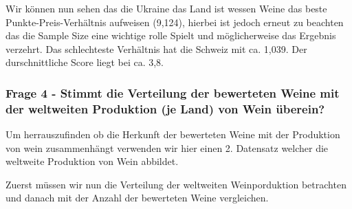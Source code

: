 \documentclass[
]{article}
\begin{document}
Wir können nun sehen das die Ukraine das Land ist wessen Weine das beste
Punkte-Preis-Verhältnis aufweisen (9,124), hierbei ist jedoch erneut zu
beachten das die Sample Size eine wichtige rolle Spielt und
möglicherweise das Ergebnis verzehrt. Das schlechteste Verhältnis hat
die Schweiz mit ca. 1,039. Der durschnittliche Score liegt bei ca. 3,8.

\subsubsection{Frage 4 - Stimmt die Verteilung der bewerteten Weine mit
der weltweiten Produktion (je Land) von Wein
überein?}\label{frage-4---stimmt-die-verteilung-der-bewerteten-weine-mit-der-weltweiten-produktion-je-land-von-wein-uxfcberein}

Um herrauszufinden ob die Herkunft der bewerteten Weine mit der
Produktion von wein zusammenhängt verwenden wir hier einen 2. Datensatz
welcher die weltweite Produktion von Wein abbildet.

Zuerst müssen wir nun die Verteilung der weltweiten Weinporduktion
betrachten und danach mit der Anzahl der bewerteten Weine vergleichen.
\end{document}

